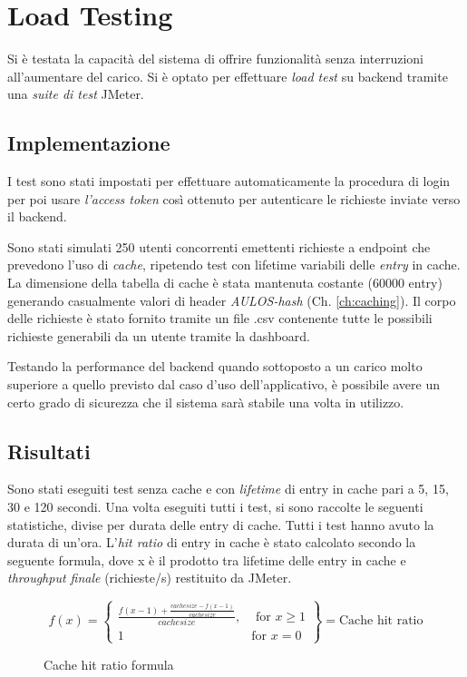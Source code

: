 \chapter{Load Testing}
\label{ch:stresstesting}
Si è testata la capacità del sistema di offrire funzionalità senza interruzioni all'aumentare del carico. 
Si è optato per effettuare\textit{ load test} su backend tramite una \textit{suite di test} JMeter. \cite{JMETER}

\section{Implementazione}

I test sono stati impostati per effettuare automaticamente la procedura di login per poi usare \textit{l'access token} così ottenuto per autenticare le richieste inviate verso il backend.

Sono stati simulati 250 utenti concorrenti emettenti richieste a endpoint che prevedono l'uso di \textit{cache}, ripetendo test con lifetime variabili delle \textit{entry} in cache.
La dimensione della tabella di cache è stata mantenuta costante (60000 entry) generando casualmente valori di header \textit{AULOS-hash} (Ch. \ref{ch:caching}).
Il corpo delle richieste è stato fornito tramite un file .csv contenente tutte le possibili richieste generabili da un utente tramite la dashboard.

Testando la performance del backend quando sottoposto a un carico molto superiore a quello previsto dal caso d'uso dell'applicativo, è possibile avere un certo grado di sicurezza che il sistema sarà stabile una volta in utilizzo.

\section{Risultati}
Sono stati eseguiti test senza cache e con \textit{lifetime} di entry in cache pari a 5, 15, 30 e 120 secondi. 
Una volta eseguiti tutti i test, si sono raccolte le seguenti statistiche, divise per durata delle entry di cache. Tutti i test hanno avuto la durata di un'ora.
L'\textit{hit ratio} di entry in cache è stato calcolato secondo la seguente formula, dove x è il prodotto tra lifetime delle entry in cache e \textit{throughput finale} (richieste/s) restituito da JMeter.
\begin{figure}[h!]

\begin{Large}
  \[
    f(x) = \left\{\begin{array}{lr}
        \frac{f(x-1)+\frac{cachesize - f(x-1)}{cachesize}}{cachesize}, & \text{ for } x\geq 1\\
        1 & \text{for } x=0
        \end{array}\right\} = \text{Cache hit ratio}
  \]
\caption{Cache hit ratio formula}
\label{fig:formula}
\end{Large}

\end{figure}
\FloatBarrier
\newpage

